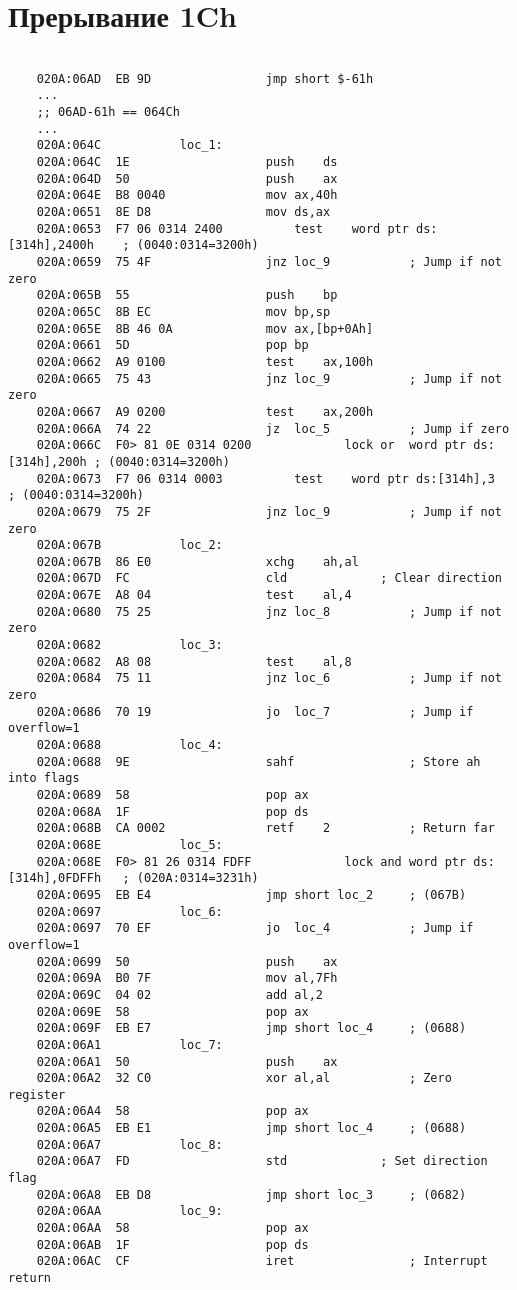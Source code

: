 \documentclass[a4paper,12pt]{bmstu}
\begin{document}
\section{Прерывание 1Ch}\label{sec:dis_1ch}
\begin{lstlisting}[style={asm},label={lst:1ch}]

    020A:06AD  EB 9D				jmp	short $-61h
    ...
    ;; 06AD-61h == 064Ch
    ...
    020A:064C			loc_1:
    020A:064C  1E					push	ds
    020A:064D  50					push	ax
    020A:064E  B8 0040				mov	ax,40h
    020A:0651  8E D8				mov	ds,ax
    020A:0653  F7 06 0314 2400			test	word ptr ds:[314h],2400h	; (0040:0314=3200h)
    020A:0659  75 4F				jnz	loc_9			; Jump if not zero
    020A:065B  55					push	bp
    020A:065C  8B EC				mov	bp,sp
    020A:065E  8B 46 0A				mov	ax,[bp+0Ah]
    020A:0661  5D					pop	bp
    020A:0662  A9 0100				test	ax,100h
    020A:0665  75 43				jnz	loc_9			; Jump if not zero
    020A:0667  A9 0200				test	ax,200h
    020A:066A  74 22				jz	loc_5			; Jump if zero
    020A:066C  F0> 81 0E 0314 0200	           lock	or	word ptr ds:[314h],200h	; (0040:0314=3200h)
    020A:0673  F7 06 0314 0003			test	word ptr ds:[314h],3	; (0040:0314=3200h)
    020A:0679  75 2F				jnz	loc_9			; Jump if not zero
    020A:067B			loc_2:
    020A:067B  86 E0				xchg	ah,al
    020A:067D  FC					cld				; Clear direction
    020A:067E  A8 04				test	al,4
    020A:0680  75 25				jnz	loc_8			; Jump if not zero
    020A:0682			loc_3:
    020A:0682  A8 08				test	al,8
    020A:0684  75 11				jnz	loc_6			; Jump if not zero
    020A:0686  70 19				jo	loc_7			; Jump if overflow=1
    020A:0688			loc_4:
    020A:0688  9E					sahf				; Store ah into flags
    020A:0689  58					pop	ax
    020A:068A  1F					pop	ds
    020A:068B  CA 0002				retf	2			; Return far
    020A:068E			loc_5:
    020A:068E  F0> 81 26 0314 FDFF	           lock	and	word ptr ds:[314h],0FDFFh	; (020A:0314=3231h)
    020A:0695  EB E4				jmp	short loc_2		; (067B)
    020A:0697			loc_6:
    020A:0697  70 EF				jo	loc_4			; Jump if overflow=1
    020A:0699  50					push	ax
    020A:069A  B0 7F				mov	al,7Fh
    020A:069C  04 02				add	al,2
    020A:069E  58					pop	ax
    020A:069F  EB E7				jmp	short loc_4		; (0688)
    020A:06A1			loc_7:
    020A:06A1  50					push	ax
    020A:06A2  32 C0				xor	al,al			; Zero register
    020A:06A4  58					pop	ax
    020A:06A5  EB E1				jmp	short loc_4		; (0688)
    020A:06A7			loc_8:
    020A:06A7  FD					std				; Set direction flag
    020A:06A8  EB D8				jmp	short loc_3		; (0682)
    020A:06AA			loc_9:
    020A:06AA  58					pop	ax
    020A:06AB  1F					pop	ds
    020A:06AC  CF					iret				; Interrupt return
\end{lstlisting}
\clearpage
\end{document}
